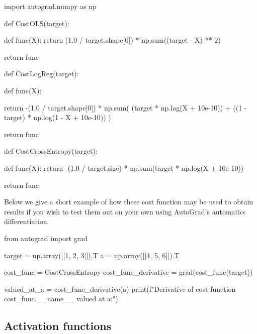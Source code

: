 \documentclass[%
oneside,                 %
final,                   %
10pt]{article}
\begin{document}
\bpycod
import autograd.numpy as np

def CostOLS(target):
    
    def func(X):
        return (1.0 / target.shape[0]) * np.sum((target - X) ** 2)

    return func


def CostLogReg(target):

    def func(X):
        
        return -(1.0 / target.shape[0]) * np.sum(
            (target * np.log(X + 10e-10)) + ((1 - target) * np.log(1 - X + 10e-10))
        )

    return func


def CostCrossEntropy(target):
    
    def func(X):
        return -(1.0 / target.size) * np.sum(target * np.log(X + 10e-10))

    return func

\epycod


Below we give a short example of how these cost function may be used
to obtain results if you wish to test them out on your own using
AutoGrad's automatics differentiation.












\bpycod
from autograd import grad

target = np.array([[1, 2, 3]]).T
a = np.array([[4, 5, 6]]).T

cost_func = CostCrossEntropy
cost_func_derivative = grad(cost_func(target))

valued_at_a = cost_func_derivative(a)
print(f"Derivative of cost function {cost_func.__name__} valued at a:")

\epycod


\subsection{Activation functions}
\end{document}
